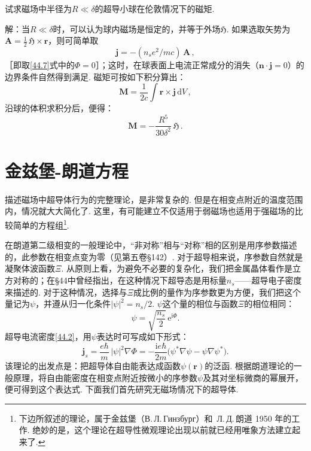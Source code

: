 \begin{xiti}

试求磁场中半径为$R\ll\delta$的超导小球在伦敦情况下的磁矩.

{\heiti 解：}当$R\ll\delta$时，可以认为球内磁场是恒定的，并等于外场$\pmb{\mathfrak H}$. 如果选取矢势为$\bm A=\frac12\,\pmb{\mathfrak H}\times\bm r$，则可简单取
\begin{equation*}
\bm j = -(n_se^2/mc)\,\bm A\,,
\end{equation*}
［即取\eqref{44.7}式中的$\Phi=0$］；这时，在球表面上电流正常成分的消失（$\bm n\cdot\bm j=0$）的边界条件自然得到满足. 磁矩可按如下积分算出：
\begin{equation*}
\bm M = \frac{1}{2c}\int\bm r\times\bm j\,\mathrm dV\,,
\end{equation*}
沿球的体积求积分后，便得：
\begin{equation*}
\bm M = -\frac{R^5}{30\delta^2}\,\pmb{\mathfrak H}\,.
\end{equation*}

\end{xiti}

\section{金兹堡-朗道方程}

描述磁场中超导体行为的完整理论，是非常复杂的. 但是在相变点附近的温度范围内，情况就大大简化了. 这里，有可能建立不仅适用于弱磁场也适用于强磁场的比较简单的方程组\footnote{下边所叙述的理论，属于金兹堡（В.\,Л.\,Гинзбург）和~Л.\,Д.\,朗道 1950 年的工作. 绝妙的是，这个理论在超导性微观理论出现以前就已经用唯象方法建立起来了.}.

在朗道第二级相变的一般理论中，“非对称”相与“对称”相的区别是用序参数描述的，此参数在相变点变为零（见第五卷§142）. 对于超导相来说，序参数自然就是凝聚体波函数$\Xi$. 从原则上看，为避免不必要的复杂化，我们把金属晶体看作是立方对称的；在§44中曾经指出，在这种情况下超导态是用标量$n_s$——超导电子密度来描述的. 对于这种情况，选择与$\Xi$成比例的量作为序参数更为方便，我们把这个量记为$\psi$，并遵从归一化条件$|\psi|^2=n_s/2$. $\psi$这个量的相位与函数$\Xi$的相位相同：
\begin{equation}
\psi = \sqrt{\frac{n_s}{2}}\,\mathrm e^{\mathrm i\Phi}.
\label{45.1}
\end{equation}
超导电流密度\eqref{44.2}，用$\psi$表达时可写成如下形式：
\begin{equation}
\bm j_s = \frac{e\hbar}{m}\,|\psi|^2\nabla\Phi
= -\frac{\mathrm ie\hbar}{2m}\bigl(\psi^{*}\nabla\psi - \psi\nabla\psi^{*}\bigr).
\label{45.2}
\end{equation}
该理论的出发点是：把超导体自由能表达成函数$\psi(\bm r)$的泛函. 根据朗道理论的一般原理，将自由能密度在相变点附近按微小的序参数$\psi$及其对坐标微商的幂展开，便可得到这个表达式. 下面我们首先研究无磁场情况下的超导体.

